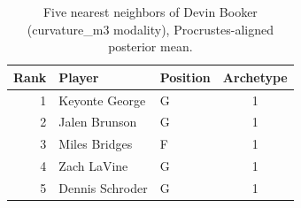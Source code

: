 \begin{table}[htbp]
  \centering\small
  \begin{tabular}{rllc}
    \toprule
    Rank & Player & Position & Archetype \\
    \midrule
    1 & Keyonte George & G & 1 \\
    2 & Jalen Brunson & G & 1 \\
    3 & Miles Bridges & F & 1 \\
    4 & Zach LaVine & G & 1 \\
    5 & Dennis Schroder & G & 1 \\
    \bottomrule
  \end{tabular}
  \caption{Five nearest neighbors of Devin Booker (curvature_m3 modality), Procrustes-aligned posterior mean.}
  \label{tab:Devin_Booker_neighbors_curvature_m3}
\end{table}

